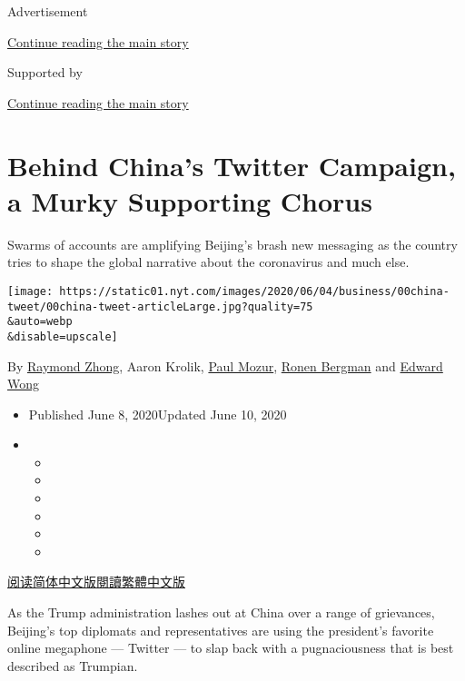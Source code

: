 Advertisement

\protect\hyperlink{after-top}{Continue reading the main story}

Supported by

\protect\hyperlink{after-sponsor}{Continue reading the main story}

\hypertarget{behind-chinas-twitter-campaign-a-murky-supporting-chorus}{%
\section{Behind China's Twitter Campaign, a Murky Supporting
Chorus}\label{behind-chinas-twitter-campaign-a-murky-supporting-chorus}}

Swarms of accounts are amplifying Beijing's brash new messaging as the
country tries to shape the global narrative about the coronavirus and
much else.

\texttt{[image: https://static01.nyt.com/images/2020/06/04/business/00china-tweet/00china-tweet-articleLarge.jpg?quality=75\\\&auto=webp\\\&disable=upscale]}

By \href{https://www.nytimes.com/by/raymond-zhong}{Raymond Zhong}, Aaron
Krolik, \href{https://www.nytimes.com/by/paul-mozur}{Paul Mozur},
\href{https://www.nytimes.com/by/ronen-bergman}{Ronen Bergman} and
\href{https://www.nytimes.com/by/edward-wong}{Edward Wong}

\begin{itemize}
\item
  Published June 8, 2020Updated June 10, 2020
\item
  \begin{itemize}
  \item
  \item
  \item
  \item
  \item
  \item
  \end{itemize}
\end{itemize}

\href{https://cn.nytimes.com/technology/20200609/china-twitter-disinformation/}{阅读简体中文版}\href{https://cn.nytimes.com/technology/20200609/china-twitter-disinformation/zh}{閱讀繁體中文版}

As the Trump administration lashes out at China over a range of
grievances, Beijing's top diplomats and representatives are using the
president's favorite online megaphone --- Twitter --- to slap back with
a pugnaciousness that is best described as Trumpian.

